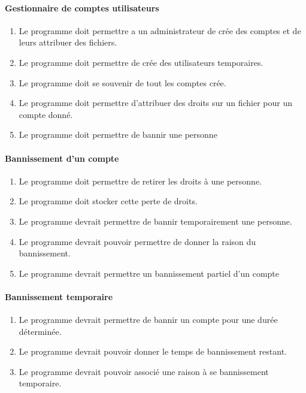 \documentclass[10pt,a4paper]{report}
\begin{document}
\paragraph{Gestionnaire de comptes utilisateurs}
	\begin{enumerate}
		\item Le programme doit permettre a un administrateur de crée des comptes et de leurs attribuer des fichiers.
		\item Le programme doit permettre de crée des utilisateurs temporaires.
		\item Le programme doit se souvenir de tout les comptes crée.
		\item Le programme doit permettre d'attribuer des droits sur un fichier pour un compte donné.
		\item Le programme doit permettre de bannir une personne
	\end{enumerate}

\paragraph{Bannissement d'un compte}
	\begin{enumerate}
		\item Le programme doit permettre de retirer les droits à une personne.
		\item Le programme doit stocker cette perte de droits.
		\item Le programme devrait permettre de bannir temporairement une personne.
		\item Le programme devrait pouvoir permettre de donner la raison du bannissement.
		\item Le programme devrait permettre un bannissement partiel d'un compte
	\end{enumerate}
	
\paragraph{Bannissement temporaire}
	\begin{enumerate}
		\item Le programme devrait permettre de bannir un compte pour une durée déterminée.
		\item Le programme devrait pouvoir donner le temps de bannissement restant.
		\item Le programme devrait pouvoir associé une raison à se bannissement temporaire.
	\end{enumerate}
	
\end{document}
